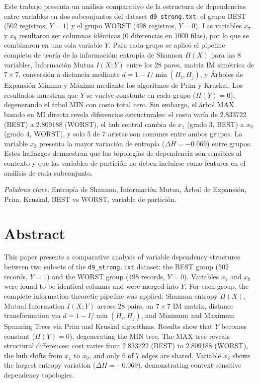 \documentclass[12pt, a4paper]{article}
\begin{document}
Este trabajo presenta un análisis comparativo de la estructura de
dependencias entre variables en dos subconjuntos del dataset
\texttt{d9\_strong.txt}: el grupo BEST (502 registros, $Y = 1$) y el grupo
WORST (498 registros, $Y = 0$). Las variables $x_7$ y $x_8$ resultaron
ser columnas idénticas (0 diferencias en 1000 filas), por lo que se
combinaron en una sola variable $Y$. Para cada grupo se aplicó el
pipeline completo de teoría de la información: entropía de Shannon
$H(X)$ para las 8 variables, Información Mutua $I(X;Y)$ entre los 28
pares, matriz IM simétrica de $7 \times 7$, conversión a distancia
mediante $d = 1 - I/\min(H_i, H_j)$, y Árboles de Expansión Mínima y
Máxima mediante los algoritmos de Prim y Kruskal. Los resultados muestran
que $Y$ se vuelve constante en cada grupo ($H(Y) = 0$), degenerando el
árbol MIN con costo total cero. Sin embargo, el árbol MAX basado en MI
directa revela diferencias estructurales: el costo varía de 2.833722 (BEST)
a 2.809188 (WORST), el hub central cambia de $x_1$ (grado 3, BEST) a $x_9$
(grado 4, WORST), y solo 5 de 7 aristas son comunes entre ambos grupos. La
variable $x_3$ presenta la mayor variación de entropía ($\Delta H = -0.069$)
entre grupos. Estos hallazgos demuestran que las topologías de dependencia
son sensibles al contexto y que las variables de partición no deben incluirse
como features en el análisis de cada subconjunto.

\vspace{0.5cm}
\noindent\textit{Palabras clave:} Entropía de Shannon, Información Mutua,
Árbol de Expansión, Prim, Kruskal, BEST vs WORST, variable de partición.


\section*{Abstract}

This paper presents a comparative analysis of variable dependency structures
between two subsets of the \texttt{d9\_strong.txt} dataset: the BEST group
(502 records, $Y = 1$) and the WORST group (498 records, $Y = 0$). Variables
$x_7$ and $x_8$ were found to be identical columns and were merged into $Y$.
For each group, the complete information-theoretic pipeline was applied:
Shannon entropy $H(X)$, Mutual Information $I(X;Y)$ across 28 pairs, an
$7 \times 7$ IM matrix, distance transformation via $d = 1 - I/\min(H_i, H_j)$,
and Minimum and Maximum Spanning Trees via Prim and Kruskal algorithms. Results
show that $Y$ becomes constant ($H(Y) = 0$), degenerating the MIN tree. The MAX
tree reveals structural differences: cost varies from 2.833722 (BEST) to
2.809188 (WORST), the hub shifts from $x_1$ to $x_9$, and only 6 of 7 edges
are shared. Variable $x_3$ shows the largest entropy variation ($\Delta H =
-0.069$), demonstrating context-sensitive dependency topologies.
\end{document}
